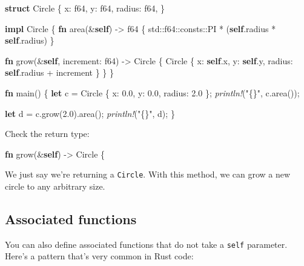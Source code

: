 \documentclass[a4paper,]{book}
\newenvironment{Shaded}{\begin{snugshade}}{\end{snugshade}}
\newcommand{\KeywordTok}[1]{\textcolor[rgb]{0.13,0.29,0.53}{\textbf{{#1}}}}
\newcommand{\DataTypeTok}[1]{\textcolor[rgb]{0.13,0.29,0.53}{{#1}}}
\newcommand{\DecValTok}[1]{\textcolor[rgb]{0.00,0.00,0.81}{{#1}}}
\newcommand{\StringTok}[1]{\textcolor[rgb]{0.31,0.60,0.02}{{#1}}}
\newcommand{\PreprocessorTok}[1]{\textcolor[rgb]{0.56,0.35,0.01}{\textit{{#1}}}}
\newcommand{\NormalTok}[1]{{#1}}
\begin{document}
\begin{Shaded}
\begin{Highlighting}[]
\KeywordTok{struct} \NormalTok{Circle \{}
    \NormalTok{x: }\DataTypeTok{f64}\NormalTok{,}
    \NormalTok{y: }\DataTypeTok{f64}\NormalTok{,}
    \NormalTok{radius: }\DataTypeTok{f64}\NormalTok{,}
\NormalTok{\}}

\KeywordTok{impl} \NormalTok{Circle \{}
    \KeywordTok{fn} \NormalTok{area(&}\KeywordTok{self}\NormalTok{) -> }\DataTypeTok{f64} \NormalTok{\{}
        \NormalTok{std::}\DataTypeTok{f64}\NormalTok{::consts::PI * (}\KeywordTok{self}\NormalTok{.radius * }\KeywordTok{self}\NormalTok{.radius)}
    \NormalTok{\}}

    \KeywordTok{fn} \NormalTok{grow(&}\KeywordTok{self}\NormalTok{, increment: }\DataTypeTok{f64}\NormalTok{) -> Circle \{}
        \NormalTok{Circle \{ x: }\KeywordTok{self}\NormalTok{.x, y: }\KeywordTok{self}\NormalTok{.y, radius: }\KeywordTok{self}\NormalTok{.radius + increment \}}
    \NormalTok{\}}
\NormalTok{\}}

\KeywordTok{fn} \NormalTok{main() \{}
    \KeywordTok{let} \NormalTok{c = Circle \{ x: }\DecValTok{0.0}\NormalTok{, y: }\DecValTok{0.0}\NormalTok{, radius: }\DecValTok{2.0} \NormalTok{\};}
    \PreprocessorTok{println!}\NormalTok{(}\StringTok{"\{\}"}\NormalTok{, c.area());}

    \KeywordTok{let} \NormalTok{d = c.grow(}\DecValTok{2.0}\NormalTok{).area();}
    \PreprocessorTok{println!}\NormalTok{(}\StringTok{"\{\}"}\NormalTok{, d);}
\NormalTok{\}}
\end{Highlighting}
\end{Shaded}

Check the return type:

\begin{Shaded}
\begin{Highlighting}[]
\KeywordTok{fn} \NormalTok{grow(&}\KeywordTok{self}\NormalTok{) -> Circle \{}
\end{Highlighting}
\end{Shaded}

We just say we're returning a \texttt{Circle}. With this method, we can
grow a new circle to any arbitrary size.

\subsection{Associated functions}\label{associated-functions}

You can also define associated functions that do not take a
\texttt{self} parameter. Here's a pattern that's very common in Rust
code:
\end{document}
